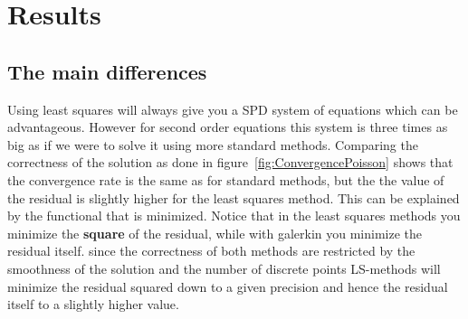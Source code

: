 
\chapter{Results} %

\label{chap:results} %


\section{The main differences}
Using least squares will always give you a SPD system of equations which can be advantageous. However for second order equations this system is three times as big as if we were to solve it using more standard methods. Comparing the correctness of the solution as done in figure~\ref{fig:ConvergencePoisson} shows that the convergence rate is the same as for standard methods, but the the value of the residual is slightly higher for the least squares method. This can be explained by the functional that is minimized. Notice that in the least squares methods you minimize the \textbf{square} of the residual, while with galerkin you minimize the residual itself. since the correctness of both methods are restricted by the smoothness of the solution and the number of discrete points LS-methods will minimize the residual squared down to a given precision and hence the residual itself to a slightly higher value. 
\newpage
